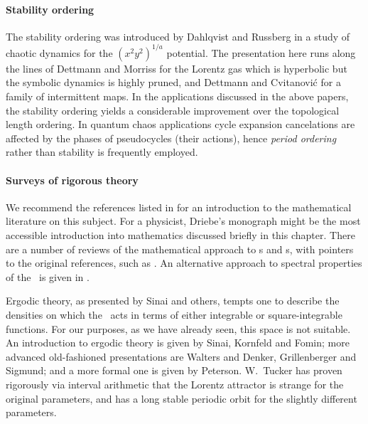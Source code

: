 

\paragraph{Stability ordering}
The stability ordering was introduced by
Dahlqvist and Russberg in a study of chaotic dynamics for the
$(x^2y^2)^{1/a}$ potential.
The presentation here runs along the lines of
Dettmann and Morriss for the Lorentz gas
which is hyperbolic but the symbolic dynamics is highly pruned, and
Dettmann and Cvitanovi\'c for a family of intermittent maps.
In
the
applications discussed in the above papers, the stability ordering
yields a considerable improvement over the topological length
ordering. In quantum chaos applications cycle expansion cancelations
are affected by the phases of pseudocycles (their actions), hence
{\em period ordering} rather than stability is frequently employed.


\paragraph{Surveys of rigorous theory}\label{rem:rig-z}
We recommend the references listed in 
for an introduction to
the mathematical literature on this subject.
For a physicist, Driebe's monograph
might be the most accessible
introduction into mathematics discussed briefly in this chapter.
There are a number of reviews of the mathematical approach to
\dzeta s and \Fd s, with pointers to the original references,
such as . An alternative approach to spectral
properties of the \FPoper\ is given in .

Ergodic theory, as presented by Sinai and others,
tempts one to describe the densities on which the \evOper\ acts
in terms of either
integrable or square-integrable functions. For our
purposes, as we have already seen,
this space is not suitable.
An introduction to ergodic theory is given by
Sinai, Kornfeld and Fomin; more advanced
old-fashioned  presentations are Walters
and Denker, Grillenberger and Sigmund; and a more formal
one is given by Peterson.
W.~Tucker has proven rigorously via interval
     arithmetic that the Lorentz attractor is strange for
     the original parameters, and has a long stable periodic orbit for
     the slightly different parameters.
